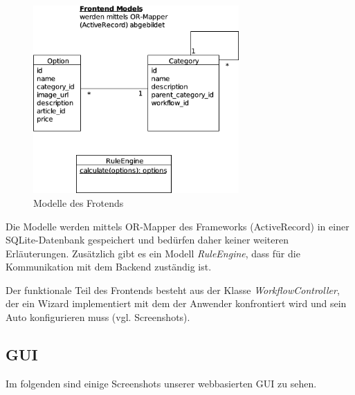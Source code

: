 \documentclass[a4paper,10pt]{article}
\begin{document}
\begin{center}
  \begin{figure}[t]
    \includegraphics[width=0.7\textwidth]{doc/frontend_models.png}
    \caption{Modelle des Frotends}
    \label{frontend_models}
  \end{figure}
\end{center}

Die Modelle werden mittels OR-Mapper des Frameworks (ActiveRecord) in einer SQLite-Datenbank gespeichert und bedürfen daher keiner weiteren Erläuterungen.
Zusätzlich gibt es ein Modell \textit{RuleEngine}, dass für die Kommunikation mit dem Backend zuständig ist.

Der funktionale Teil des Frontends besteht aus der Klasse \textit{WorkflowController}, der ein Wizard implementiert mit dem der Anwender konfrontiert wird und sein Auto konfigurieren muss (vgl. Screenshots).

\subsection*{GUI}

Im folgenden sind einige Screenshots unserer webbasierten GUI zu sehen.
\end{document}

